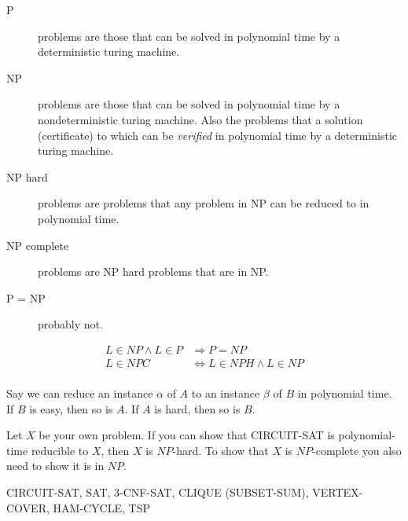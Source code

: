 \documentclass[10pt, a4paper,landscape]{article}
\begin{document}
\begin{multicols*}{4}
\begin{description}
    \item[P] problems are those that can be solved in polynomial time by a deterministic turing machine.
    \item[NP] problems are those that can be solved in polynomial time by a nondeterministic turing machine.
        Also the problems that a solution (certificate) to which can be \emph{verified} in polynomial time by a deterministic turing machine.
    \item[NP hard] problems are problems that any problem in NP can be reduced to in polynomial time.
    \item[NP complete] problems are NP hard problems that are in NP.
    \item[P = NP] probably not.
\end{description}

\begin{align*}
L \in NP \wedge L \in P &\Rightarrow P = NP\\
L \in NPC &\Leftrightarrow L \in NPH \wedge L \in NP\\
\end{align*}

Say we can reduce an instance $\alpha$ of $A$ to an instance $\beta$ of $B$ in polynomial time. If $B$ is easy, then so is $A$. If $A$ is hard, then so is $B$.

Let $X$ be your own problem. If you can show that CIRCUIT-SAT is polynomial-time reducible to $X$, then $X$ is $NP$-hard. To show that $X$ is $NP$-complete you also need to show it is in $NP$.


CIRCUIT-SAT, SAT, 3-CNF-SAT, CLIQUE (SUBSET-SUM), VERTEX-COVER, HAM-CYCLE, TSP


\end{multicols*}
\end{document}
